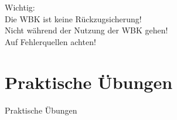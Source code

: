 \documentclass[aspectratio=169]{beamer}
\begin{document}
                                        \begin{frame}
                                        \begin{center}
                                        \color{red}
                                        \huge{Wichtig:} \\
                                        \normalsize
                                        \pause Die WBK ist keine Rückzugsicherung! \\
                                        \pause Nicht während der Nutzung der WBK gehen! \\
                                        \pause Auf Fehlerquellen achten! \\
                                        
                                        \end{center}
                                        \end{frame}

                                        \section{Praktische Übungen}
                                        \begin{frame}
                                        \Huge{\centerline{Praktische Übungen}}
                                        \end{frame}


                                        
\end{document}
